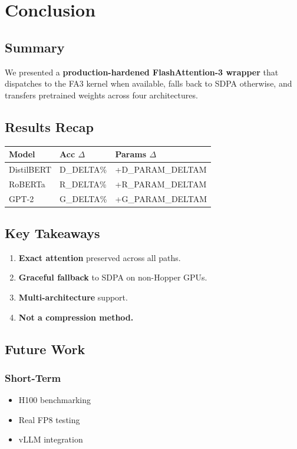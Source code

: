 \section{Conclusion}

\subsection{Summary}

We presented a \textbf{production-hardened FlashAttention-3 wrapper} that 
dispatches to the FA3 kernel when available, falls back to SDPA otherwise, 
and transfers pretrained weights across four architectures.

\subsection{Results Recap}

\begin{table}[H]
\centering
\small
\begin{tabular}{lll}
\toprule
\textbf{Model} & \textbf{Acc $\Delta$} & \textbf{Params $\Delta$} \\
\midrule
DistilBERT & {{D\_DELTA}}\% & +{{D\_PARAM\_DELTA}}M \\
RoBERTa & {{R\_DELTA}}\% & +{{R\_PARAM\_DELTA}}M \\
GPT-2 & {{G\_DELTA}}\% & +{{G\_PARAM\_DELTA}}M \\
\bottomrule
\end{tabular}
\end{table}

\subsection{Key Takeaways}

\begin{enumerate}
\item \textbf{Exact attention} preserved across all paths.
\item \textbf{Graceful fallback} to SDPA on non-Hopper GPUs.
\item \textbf{Multi-architecture} support.
\item \textbf{Not a compression method.}

\end{enumerate}
\subsection{Future Work}

\subsubsection{Short-Term}
\begin{itemize}
\item H100 benchmarking
\item Real FP8 testing
\item vLLM integration

\end{itemize}
